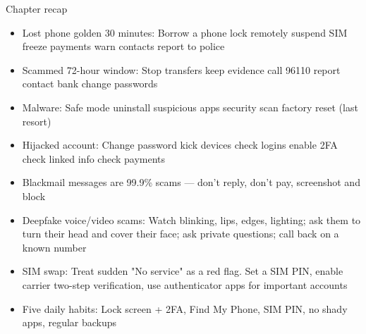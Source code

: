 \begin{tcbsummary}{Chapter recap}
\begin{itemize}
  \item Lost phone golden 30 minutes: Borrow a phone lock remotely suspend SIM freeze payments warn contacts report to police
  \item Scammed 72-hour window: Stop transfers keep evidence call 96110 report contact bank change passwords
  \item Malware: Safe mode uninstall suspicious apps security scan factory reset (last resort)
  \item Hijacked account: Change password kick devices check logins enable 2FA check linked info check payments
  \item Blackmail messages are 99.9\% scams — don't reply, don't pay, screenshot and block
  \item Deepfake voice/video scams: Watch blinking, lips, edges, lighting; ask them to turn their head and cover their face; ask private questions; call back on a known number
  \item SIM swap: Treat sudden "No service" as a red flag. Set a SIM PIN, enable carrier two-step verification, use authenticator apps for important accounts
  \item Five daily habits: Lock screen + 2FA, Find My Phone, SIM PIN, no shady apps, regular backups
\end{itemize}

\end{tcbsummary}
